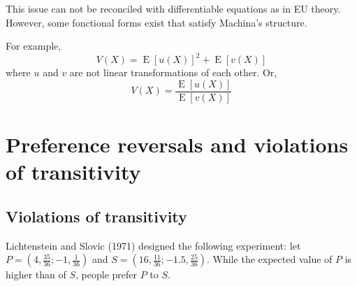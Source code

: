 \documentclass[12pt]{report}
\newcommand{\E}[1]{\operatorname{E}\left[#1\right]}
\begin{document}
This issue can not be reconciled with differentiable equations as in EU theory. However, some fonctional forms exist that satisfy Machina's structure.

For example, $$V(X) = \E{u(X)}^2 + \E{v(X)}$$ where $u$ and $v$ are not linear transformations of each other. Or, $$V(X) = \frac{\E{u(X)}}{\E{v(X)}}$$

\chapter{Preference reversals and violations of transitivity}

\section{Violations of transitivity}

Lichtenstein and Slovic (1971) designed the following experiment: let $P=(4,\frac{35}{36};-1,\frac{1}{36})$ and $S = (16, \frac{11}{36}; -1.5, \frac{25}{36})$. While the expected value of $P$ is higher than of $S$, people prefer $P$ to $S$.
\end{document}
